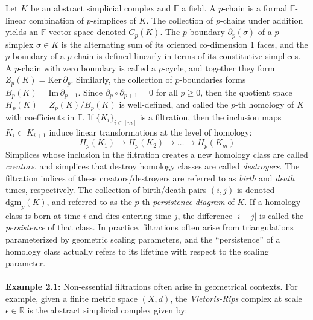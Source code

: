 \documentclass{article} %
\begin{document}
Let $K$ be an abstract simplicial complex and $\mathbb{F}$ a field.
A $p$-chain is a
formal $\mathbb{F}$-linear combination  of $p$-simplices of $K$. The collection of $p$-chains under addition yields an 
$\mathbb{F}$-vector space  denoted   $C_p(K)$. 
The $p$-boundary $\partial_p(\sigma)$  of a $p$-simplex $\sigma\in K$ is the alternating sum of its oriented co-dimension 1 faces,
and the $p$-boundary of a $p$-chain is defined 
linearly in terms of its constitutive simplices. 
A $p$-chain with zero boundary is called a $p$-cycle, and together they form $Z_p(K) = \mathrm{Ker}\,\partial_p$. 
Similarly, the collection of $p$-boundaries forms  $B_p(K) = \mathrm{Im}\,\partial_{p+1}$.
Since $\partial_p \circ \partial_{p+1} = 0$ for all $p\geq 0$, 
then the quotient space $H_p(K) = Z_p(K) / B_{p}(K)$ is well-defined, and called the 
$p$-th homology of $K$ with coefficients in $\mathbb{F}$. 
If $\{K_i\}_{i\in [m]}$ is a filtration, then the inclusion maps  $K_i\subset K_{i+1}$   induce linear transformations 
at the level of homology:
\begin{equation}
	H_p(K_1) \to H_p(K_2) \to \dots \to H_p(K_m)
\end{equation}
Simplices whose inclusion in the filtration creates a new homology class are   called \emph{creators}, and simplices that destroy homology classes are   called \emph{destroyers}. 
The filtration indices of 
these creators/destroyers are referred to as \emph{birth} and \emph{death} times, respectively. 
The collection of birth/death  pairs 
$(i,j)$ is denoted $\mathrm{dgm}_p(K)$, 
and referred to as the $p$-th \emph{persistence diagram} of $K$.
If a homology class is born at time $i$ and dies entering time $j$, the difference $\lvert i - j \rvert$ is called the \emph{persistence} of that class.
In practice, filtrations often arise from triangulations parameterized by geometric scaling parameters, and the ``persistence'' of a homology class actually refers to its lifetime with respect to the scaling parameter. 
\\
\\
\noindent \textbf{Example 2.1:} Non-essential filtrations often arise in geometrical contexts. For example, given a finite metric space $(X, d)$, the \emph{Vietoris-Rips} complex at scale $\epsilon \in \mathbb{R}$ is the abstract simplicial complex given by: 
\end{document}
